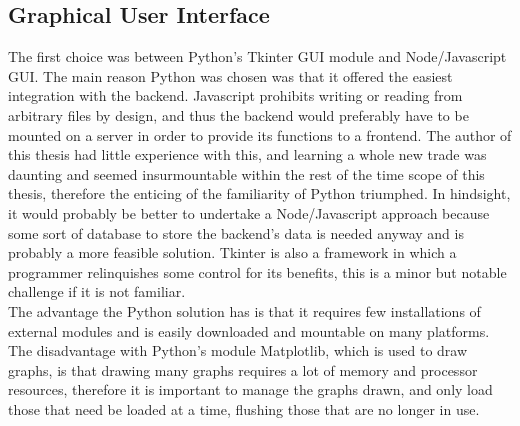 \subsection{Graphical User Interface}
The first choice was between Python's Tkinter GUI module and Node/Javascript GUI. The main reason Python was chosen was that it offered the easiest integration with the backend. Javascript prohibits writing or reading from arbitrary files by design, and thus the backend would preferably have to be mounted on a server in order to provide its functions to a frontend. The author of this thesis had little experience with this, and learning a whole new trade was daunting and seemed insurmountable within the rest of the time scope of this thesis, therefore the enticing of the familiarity of Python triumphed. In hindsight, it would probably be better to undertake a Node/Javascript approach because some sort of database to store the backend's data is needed anyway and is probably a more feasible solution. Tkinter is also a framework in which a programmer relinquishes some control for its benefits, this is a minor but notable challenge if it is not familiar.
\\
The advantage the Python solution has is that it requires few installations of external modules and is easily downloaded and mountable on many platforms.
The disadvantage with Python's module Matplotlib, which is used to draw graphs, is that drawing many graphs requires a lot of memory and processor resources, therefore it is important to manage the graphs drawn, and only load those that need be loaded at a time, flushing those that are no longer in use.

